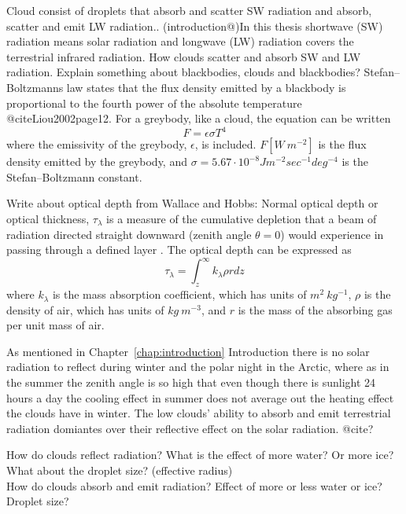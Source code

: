 Cloud consist of droplets that absorb and scatter SW radiation and absorb, scatter and emit LW radiation.. 
(introduction@)In this thesis shortwave (SW) radiation means solar radiation and longwave (LW) radiation covers the terrestrial infrared radiation.
How clouds scatter and absorb SW and LW radiation.
Explain something about blackbodies, clouds and blackbodies? Stefan–Boltzmanns law states that the flux density emitted by a blackbody is proportional to the fourth power of the absolute temperature @citeLiou2002page12. For a greybody, like a cloud, the equation can be written
\begin{equation}
F = \epsilon \sigma T^4
\end{equation}
where the emissivity of the greybody, $\epsilon$, is included. $F [W~m^{-2}]$ is the flux density emitted by the greybody, and $\sigma = 5.67\cdot 10^{-8} Jm^{-2}sec^{-1}deg^{-4}$ is the Stefan–Boltzmann constant.


Write about optical depth from Wallace and Hobbs: Normal optical depth or optical thickness, $\tau_{\lambda}$ is a measure of the cumulative depletion that a beam of radiation directed straight downward (zenith angle $\theta = 0$) would experience in passing through a defined layer \citep{WallaceHobbs2006}. The optical depth can be expressed as
\begin{equation}
\tau_{\lambda} = \int_z^{\infty} k_{\lambda} \rho r dz
\end{equation}
where $k_{\lambda}$ is the mass absorption coefficient, which has units of $m^2~kg^{-1}$, $\rho$ is the density of air, which has units of $kg~m^{-3}$, and $r$ is the mass of the absorbing gas per unit mass of air.



As mentioned in Chapter~\ref{chap:introduction} Introduction there is no solar radiation to reflect during winter and the polar night in the Arctic, where as in the summer the zenith angle is so high that even though there is sunlight 24 hours a day the cooling effect in summer does not average out the heating effect the clouds have in winter. The low clouds' ability to absorb and emit terrestrial radiation domiantes over their reflective effect on the solar radiation. @cite?

How do clouds reflect radiation? What is the effect of more water? Or more ice? What about the droplet size? (effective radius)\\
How do clouds absorb and emit radiation? Effect of more or less water or ice? Droplet size?

